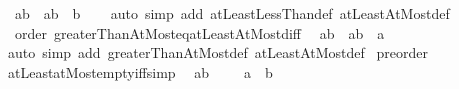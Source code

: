 \begin{isabellebody}
\ \ {\isachardoublequoteopen}{\isacharbraceleft}{\kern0pt}a{\isachardot}{\kern0pt}{\isachardot}{\kern0pt}{\isacharless}{\kern0pt}b{\isacharbraceright}{\kern0pt}\ {\isacharequal}{\kern0pt}\ {\isacharbraceleft}{\kern0pt}a{\isachardot}{\kern0pt}{\isachardot}{\kern0pt}b{\isacharbraceright}{\kern0pt}\ {\isacharminus}{\kern0pt}\ {\isacharbraceleft}{\kern0pt}b{\isacharbraceright}{\kern0pt}{\isachardoublequoteclose}\isanewline
%
\isadelimproof
\ \ %
\endisadelimproof
%
\isatagproof
{}\isamarkupfalse%
\ {\isacharparenleft}{\kern0pt}auto\ simp\ add{\isacharcolon}{\kern0pt}\ atLeastLessThan{\isacharunderscore}{\kern0pt}def\ atLeastAtMost{\isacharunderscore}{\kern0pt}def{\isacharparenright}{\kern0pt}%
\endisatagproof
{\isafoldproof}%
%
\isadelimproof
\isanewline
%
\endisadelimproof
\isanewline
{}\isamarkupfalse%
\ {\isacharparenleft}{\kern0pt}\ order{\isacharparenright}{\kern0pt}\ greaterThanAtMost{\isacharunderscore}{\kern0pt}eq{\isacharunderscore}{\kern0pt}atLeastAtMost{\isacharunderscore}{\kern0pt}diff{\isacharcolon}{\kern0pt}\isanewline
\ \ {\isachardoublequoteopen}{\isacharbraceleft}{\kern0pt}a{\isacharless}{\kern0pt}{\isachardot}{\kern0pt}{\isachardot}{\kern0pt}b{\isacharbraceright}{\kern0pt}\ {\isacharequal}{\kern0pt}\ {\isacharbraceleft}{\kern0pt}a{\isachardot}{\kern0pt}{\isachardot}{\kern0pt}b{\isacharbraceright}{\kern0pt}\ {\isacharminus}{\kern0pt}\ {\isacharbraceleft}{\kern0pt}a{\isacharbraceright}{\kern0pt}{\isachardoublequoteclose}\isanewline
%
\isadelimproof
\ \ %
\endisadelimproof
%
\isatagproof
{}\isamarkupfalse%
\ {\isacharparenleft}{\kern0pt}auto\ simp\ add{\isacharcolon}{\kern0pt}\ greaterThanAtMost{\isacharunderscore}{\kern0pt}def\ atLeastAtMost{\isacharunderscore}{\kern0pt}def{\isacharparenright}{\kern0pt}%
\endisatagproof
{\isafoldproof}%
%
\isadelimproof
\isanewline
%
\endisadelimproof
\isanewline
{}\isamarkupfalse%
%
\isadelimdocument
%
\endisadelimdocument
%
\isatagdocument
%
\isamarkuptrue%
%
\endisatagdocument
{\isafolddocument}%
%
\isadelimdocument
%
\endisadelimdocument
{}\isamarkupfalse%
\ preorder\isanewline
{}\isanewline
\isanewline
{}\isamarkupfalse%
\ atLeastatMost{\isacharunderscore}{\kern0pt}empty{\isacharunderscore}{\kern0pt}iff{\isacharbrackleft}{\kern0pt}simp{\isacharbrackright}{\kern0pt}{\isacharcolon}{\kern0pt}\isanewline
\ \ {\isachardoublequoteopen}{\isacharbraceleft}{\kern0pt}a{\isachardot}{\kern0pt}{\isachardot}{\kern0pt}b{\isacharbraceright}{\kern0pt}\ {\isacharequal}{\kern0pt}\ {\isacharbraceleft}{\kern0pt}{\isacharbraceright}{\kern0pt}\ {\isasymlongleftrightarrow}\ {\isacharparenleft}{\kern0pt}{\isasymnot}\ a\ {\isasymle}\ b{\isacharparenright}{\kern0pt}{\isachardoublequoteclose}\isanewline

\end{isabellebody}
